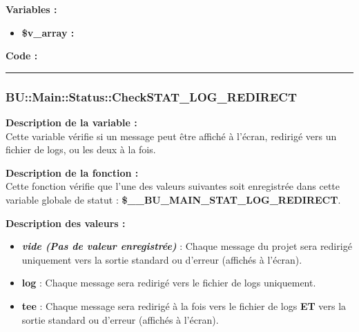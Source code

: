 \documentclass[a4paper,10pt]{article}
\begin{document}
\begin{justify}
    \textbf{Variables :}

    \begin{itemize}
        \item \textbf{\color{orange}\$v\_array\color{white} :}
    \end{itemize}
\end{justify}

\begin{justify}
    \textbf{Code :}
\end{justify}



\color{blue}\par\noindent\rule{\textwidth}{0.4pt}\color{white}

\color{blue}
\subsubsection{\color{mauve}BU::Main::Status::CheckSTAT\_LOG\_REDIRECT}\color{white}

\begin{justify}
    \textbf{Description de la variable :}\\
    Cette variable vérifie si un message peut être affiché à l'écran, redirigé vers un fichier de logs, ou les deux à la fois.
\end{justify}

\begin{justify}
    \textbf{Description de la fonction :}\\
    Cette fonction vérifie que l'une des valeurs suivantes soit enregistrée dans cette variable globale de statut : \textbf{\color{orange}\$\_\_BU\_MAIN\_STAT\_LOG\_REDIRECT}.
\end{justify}

\begin{justify}
    \textbf{Description des valeurs :}

    \begin{itemize}
        \item \textbf{\textit{vide (Pas de valeur enregistrée)}} : Chaque message du projet sera redirigé uniquement vers la sortie standard ou d'erreur (affichés à l'écran).\\

        \item \textbf{log} : Chaque message sera redirigé vers le fichier de logs uniquement.\\

        \item \textbf{tee} : Chaque message sera redirigé à la fois vers le fichier de logs \textbf{ET} vers la sortie standard ou d'erreur (affichés à l'écran).
    \end{itemize}

\end{justify}
\end{document}
